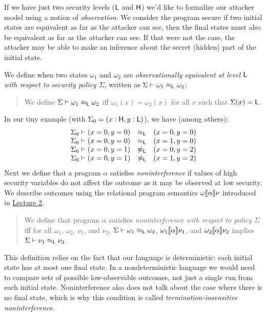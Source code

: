 \documentclass[11pt]{article}
\newcommand{\courseurl}{https://15316-cmu.github.io/2026/}
\begin{document}
If we have just two security levels ($\mathsf{L}$ and $\mathsf{H}$) we'd like to
formalize our attacker model using a notion of \emph{observation}.  We consider
the program secure if two initial states are equivalent as far as the attacker
can see, then the final states must also be equivalent as far as the attacker
can see.  If that were not the case, the attacker may be able to make an
inference about the secret (hidden) part of the initial state.

We define when two states $\omega_1$ and $\omega_2$ are \emph{observationally
  equivalent at level $\mathsf{L}$ with respect to security policy $\Sigma$},
written as $\Sigma \vdash \omega_1 \approx_{\mathsf{L}} \omega_2$:
\begin{quote}
  We define $\Sigma \vdash \omega_1 \approx_{\mathsf{L}} \omega_2$
  iff $\omega_1(x) = \omega_2(x)$ for all $x$ such that $\Sigma(x) = \mathsf{L}$.
\end{quote}
In our tiny example (with $\Sigma_0 = (x : \mathsf{H}, y : \mathsf{L})$), we have
(among others):
\[
  \begin{array}{lcl}
    \Sigma_0 \vdash (x = 0, y = 0) & \approx_{\mathsf{L}} & (x = 0, y = 0) \\
    \Sigma_0 \vdash (x = 0, y = 0) & \approx_{\mathsf{L}} & (x = 1, y = 0) \\
    \Sigma_0 \vdash (x = 0, y = 1) & \not\approx_{\mathsf{L}} & (x = 0, y = 2) \\
    \Sigma_0 \vdash (x = 0, y = 1) & \not\approx_{\mathsf{L}} & (x = 1, y = 2) 
  \end{array}
\]
Next we define that a program $\alpha$ satisfies \emph{noninterference} if
values of high security variables do not affect the outcome as it may be
observed at low security.  We describe outcomes using the relational program
semantics $\omega \llbracket \alpha \rrbracket \nu$ introduced in
\href{\courseurl/lectures/02-semantics.pdf}{Lecture 2}.
\begin{quote}
  We define that program $\alpha$ satisfies \emph{noninterference with respect to
    policy $\Sigma$}\newline iff for all $\omega_1$, $\omega_2$, $\nu_1$, and $\nu_2$,\newline
  $\Sigma \vdash \omega_1 \approx_{\mathsf{L}} \omega_2$,
  $\omega_1 \llbracket \alpha \rrbracket \nu_1$, and $\omega_2 \llbracket \alpha \rrbracket \nu_2$
  implies $\Sigma \vdash \nu_1 \approx_{\mathsf{L}} \nu_2$.
\end{quote}
This definition relies on the fact that our language is deterministic: each
initial state has at most one final state.  In a nondeterministic language we
would need to compare sets of possible low-observable outcomes, not just a
single run from each initial state.  Noninterference also does not talk about
the case where there is no final state, which is why this condition is called
\emph{termination-insensitive noninterference}.
\end{document}
